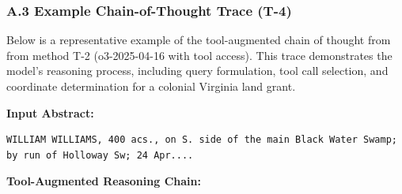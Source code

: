 \documentclass[
  10pt]{article}
\begin{document}
\subsubsection{A.3 Example Chain-of-Thought Trace
(T-4)}\label{app-cot-trace}

Below is a representative example of the tool-augmented chain of thought
from from method T-2 (o3-2025-04-16 with tool access). This trace
demonstrates the model's reasoning process, including query formulation,
tool call selection, and coordinate determination for a colonial
Virginia land grant.

\textbf{Input Abstract:}

\begin{lstlisting}
WILLIAM WILLIAMS, 400 acs., on S. side of the main Black Water Swamp; by run of Holloway Sw; 24 Apr....
\end{lstlisting}

\textbf{Tool-Augmented Reasoning Chain:}
\end{document}
